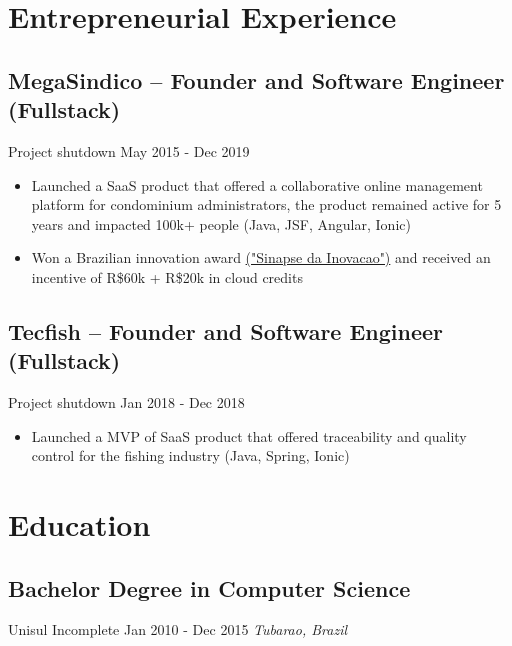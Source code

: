 \documentclass[11pt, a4paper]{article}
\begin{document}
\section*{Entrepreneurial Experience}
\subsection*{MegaSindico -- Founder and Software Engineer (Fullstack)}
Project shutdown \hfill May 2015 - Dec 2019
\begin{itemize}[noitemsep]
    \item Launched a SaaS product that offered a collaborative online management platform for condominium administrators, the product remained active for 5 years and impacted 100k+ people (Java, JSF, Angular, Ionic)
    \item Won a Brazilian innovation award \href{https://certi.org.br/pt/cases-sinapse-da-inovacao}{("Sinapse da Inovacao")} and received an incentive of R\$60k + R\$20k in cloud credits
\end{itemize}

\subsection*{Tecfish -- Founder and Software Engineer (Fullstack)}
Project shutdown \hfill Jan 2018 - Dec 2018
\begin{itemize}[noitemsep]
    \item Launched a MVP of SaaS product that offered traceability and quality control for the fishing industry (Java, Spring, Ionic)
\end{itemize}

\section*{Education}
\subsection*{Bachelor Degree in Computer Science}
Unisul \hfill Incomplete \hfill Jan 2010 - Dec 2015
\textit{Tubarao, Brazil}
\end{document}
